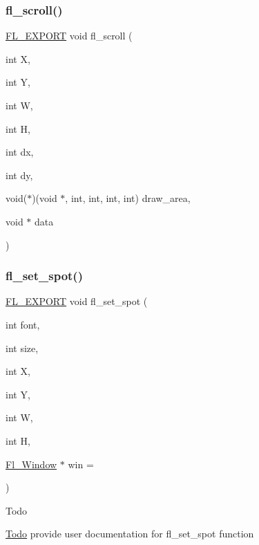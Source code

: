 \subsubsection{\texorpdfstring{fl\+\_\+scroll()}{fl\_scroll()}}
{\footnotesize\ttfamily \hyperlink{_fl___export_8_h_aa9ba29a18aee9d738370a06eeb4470fc}{F\+L\+\_\+\+E\+X\+P\+O\+RT} void fl\+\_\+scroll (\begin{DoxyParamCaption}\item[{int}]{X,  }\item[{int}]{Y,  }\item[{int}]{W,  }\item[{int}]{H,  }\item[{int}]{dx,  }\item[{int}]{dy,  }\item[{void($\ast$)(void $\ast$, int, int, int, int)}]{draw\+\_\+area,  }\item[{void $\ast$}]{data }\end{DoxyParamCaption})}

\mbox{\label{group__fl__drawings_ga748fcead12c8cc67cb517cab02c273a2}} 
\subsubsection{\texorpdfstring{fl\+\_\+set\+\_\+spot()}{fl\_set\_spot()}}
{\footnotesize\ttfamily \hyperlink{_fl___export_8_h_aa9ba29a18aee9d738370a06eeb4470fc}{F\+L\+\_\+\+E\+X\+P\+O\+RT} void fl\+\_\+set\+\_\+spot (\begin{DoxyParamCaption}\item[{int}]{font,  }\item[{int}]{size,  }\item[{int}]{X,  }\item[{int}]{Y,  }\item[{int}]{W,  }\item[{int}]{H,  }\item[{\hyperlink{class_fl___window}{Fl\+\_\+\+Window} $\ast$}]{win = {} }\end{DoxyParamCaption})}

\begin{DoxyRefDesc}{Todo}
\item[\hyperlink{todo__todo000014}{Todo}]provide user documentation for fl\+\_\+set\+\_\+spot function \end{DoxyRefDesc}
\mbox{\label{group__fl__drawings_ga496c7d22ad30fe84717bb765dd6d1fc8}} 
